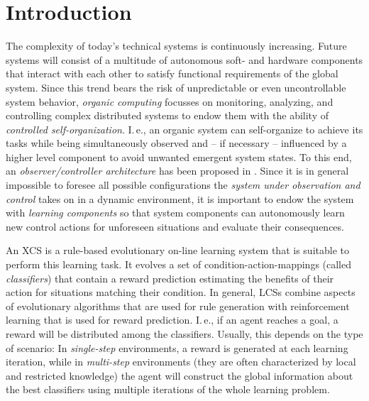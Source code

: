 \section{Introduction}
\label{section:introduction}

The complexity of today's technical systems is continuously increasing. Future systems will consist of a multitude of autonomous soft- and hardware components that interact with each other to satisfy functional requirements of the global system. Since this trend bears the risk of unpredictable or even uncontrollable system behavior, \emph{organic computing} \cite{Sch05b} %
focusses on monitoring, analyzing, and controlling complex distributed systems to endow them with the ability of \emph{controlled self-organization}. I.\,e., an or\-ga\-nic system can self-organize to achieve its tasks while being simultaneously observed and -- if necessary -- influenced by a higher level component to avoid unwanted emergent system states. To this end, an \emph{observer/controller architecture} has been proposed in \cite{RMB+06}. %
Since it is in general impossible to foresee all possible configurations the \emph{system under observation and control} takes on in a dynamic environment, it is important to endow the system with \emph{learning components} so that system components can autonomously learn new control actions for unforeseen situations and evaluate their consequences.

An XCS \cite{Wil95} is a rule-based evolutionary on-line learning system that is suitable to perform this learning task. It evolves a set of condition-action-mappings (called \emph{classifiers}) that contain a reward prediction estimating the benefits of their action for situations matching their condition. In general, LCSs combine aspects of evolutionary algorithms that are used for rule generation with reinforcement learning that is used for reward prediction. I.\,e., if an agent reaches a goal, a reward will be distributed among the classifiers. Usually, this depends on the type of scenario: In \emph{single-step} environments, a reward is generated at each learning iteration, while in \emph{multi-step} environments (they are often characterized by local and restricted knowledge) the agent will construct the global information about the best classifiers %
using multiple %
iterations of the whole learning problem.

